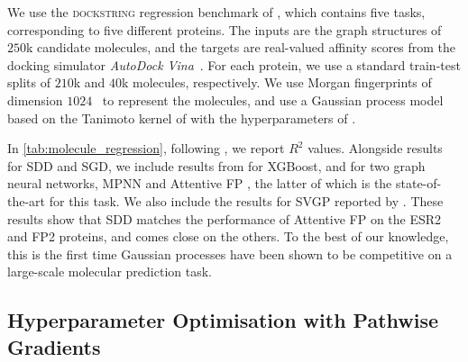 We use the \textsc{dockstring} regression benchmark of \textcite{Ortegon2022dockstring}, which contains five tasks, corresponding to five different proteins. 
The inputs are the graph structures of $250$k candidate molecules, and the targets are real-valued affinity scores from the docking simulator \emph{AutoDock Vina}~\cite{trott2010autodock}. 
For each protein, we use a standard train-test splits of $210$k and $40$k molecules, respectively.
We use Morgan fingerprints of dimension $1024$~\cite{rogers2010extended} to represent the molecules, and use a Gaussian process model based on the Tanimoto kernel of \textcite{ralaivola2005graph} with the hyperparameters of \textcite{tripp2023tanimoto}. 
\begin{table}[t]
    \caption[Experimental results for molecular binding affinity prediction]{Test set $R^2$ scores obtained for each target protein on the \textsc{dockstring} molecular binding affinity prediction task. Results with (\ensuremath{\cdot})\textsuperscript{\ensuremath{\dagger}} are from \textcite{Ortegon2022dockstring}, those with (\ensuremath{\cdot})\textsuperscript{\ensuremath{\ddagger}} are from \textcite{tripp2023tanimoto}. SVGP uses 1000 inducing points. SDD\textsuperscript{\ensuremath{*}} denotes this work.}
    \label{tab:molecule_regression}
    \vspace{8pt}
    \centering
    \scriptsize
    \setlength{\tabcolsep}{2.5pt}
    \renewcommand{\arraystretch}{1.4}
    
\end{table}

In \cref{tab:molecule_regression}, following \textcite{Ortegon2022dockstring}, we report $R^2$ values. Alongside results for SDD and SGD, we include results from \textcite{Ortegon2022dockstring} for XGBoost, and for two graph neural networks, MPNN \cite{gilmer2017neural} and Attentive FP \cite{xiong2019pushing}, the latter of which is the state-of-the-art for this task. 
We also include the results for SVGP reported by \textcite{tripp2023tanimoto}. 
These results show that SDD matches the performance of Attentive FP on the ESR2 and FP2 proteins, and comes close on the others. 
To the best of our knowledge, this is the first time Gaussian processes have been shown to be competitive on a large-scale molecular prediction task.

\subsection{Hyperparameter Optimisation with Pathwise Gradients}

